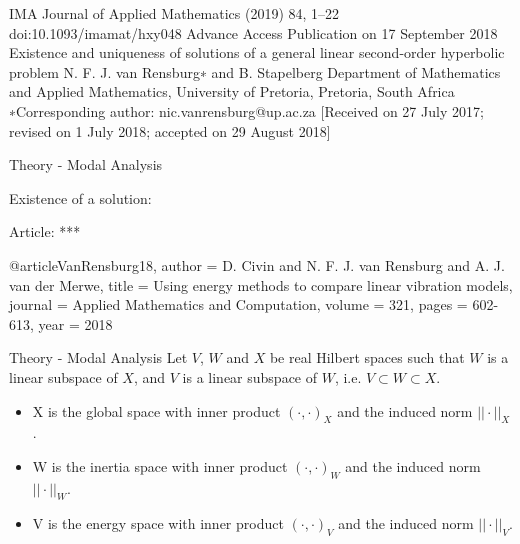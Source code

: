 \documentclass{beamer}
\begin{document}
 IMA Journal of Applied Mathematics (2019) 84, 1–22
 doi:10.1093/imamat/hxy048
 Advance Access Publication on 17 September 2018
 Existence and uniqueness of solutions of a general linear second-order
 hyperbolic problem
 N. F. J. van Rensburg∗ and B. Stapelberg
 Department of Mathematics and Applied Mathematics, University of Pretoria, Pretoria, South Africa
 ∗Corresponding author: nic.vanrensburg@up.ac.za
 [Received on 27 July 2017; revised on 1 July 2018; accepted on 29 August 2018]

 \begin{frame}{Theory - Modal Analysis}

    Existence of a solution:

    Article: 
    ***

    @article{VanRensburg18,
  author  = {D. Civin and N. F. J. van Rensburg and A. J. van der Merwe},
  title   = {Using energy methods to compare linear vibration models},
  journal = {Applied Mathematics and Computation},
  volume  = {321},
  pages   = {602-613},
  year    = {2018}
}

\end{frame}

\begin{frame}{Theory - Modal Analysis}
    Let $V$, $W$ and $X$ be real Hilbert spaces such that $W$ is a linear subspace of $X$, and $V$ is a linear subspace of $W$, i.e. $V \subset W \subset X$.
    \begin{itemize}
        \item[] X is the global space with inner product $(\cdot,\cdot)_X$ and the induced norm $||\cdot||_X$.
        \item[] W is the inertia space with inner product $(\cdot,\cdot)_W$ and the induced norm $||\cdot||_W$.
        \item[] V is the energy space with inner product $(\cdot,\cdot)_V$ and the induced norm $||\cdot||_V$.
    \end{itemize}
\end{frame}
\end{document}
